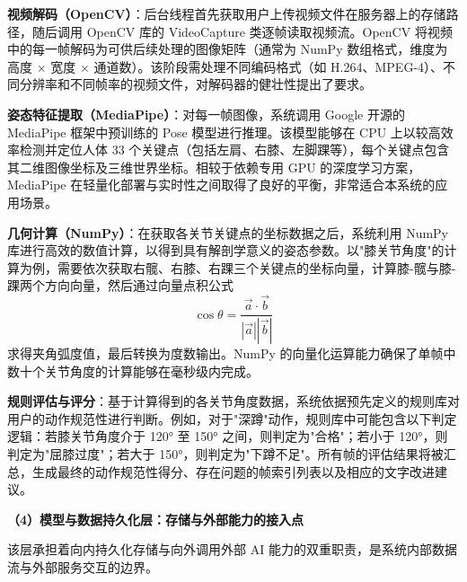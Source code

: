 \begin{chineseenum}
  \item \textbf{视频解码（OpenCV）}：后台线程首先获取用户上传视频文件在服务器上的存储路径，随后调用 OpenCV 库的 VideoCapture 类逐帧读取视频流。OpenCV 将视频中的每一帧解码为可供后续处理的图像矩阵（通常为 NumPy 数组格式，维度为高度 × 宽度 × 通道数）。该阶段需处理不同编码格式（如 H.264、MPEG-4）、不同分辨率和不同帧率的视频文件，对解码器的健壮性提出了要求。

  \item \textbf{姿态特征提取（MediaPipe）}：对每一帧图像，系统调用 Google 开源的 MediaPipe 框架中预训练的 Pose 模型进行推理。该模型能够在 CPU 上以较高效率检测并定位人体 33 个关键点（包括左肩、右膝、左脚踝等），每个关键点包含其二维图像坐标及三维世界坐标。相较于依赖专用 GPU 的深度学习方案，MediaPipe 在轻量化部署与实时性之间取得了良好的平衡，非常适合本系统的应用场景。

  \item \textbf{几何计算（NumPy）}：在获取各关节关键点的坐标数据之后，系统利用 NumPy 库进行高效的数值计算，以得到具有解剖学意义的姿态参数。以"膝关节角度"的计算为例，需要依次获取右髋、右膝、右踝三个关键点的坐标向量，计算膝-髋与膝-踝两个方向向量，然后通过向量点积公式
  \begin{equation}
    \cos\theta = \frac{\vec{a} \cdot \vec{b}}{|\vec{a}| |\vec{b}|}
  \end{equation}
  求得夹角弧度值，最后转换为度数输出。NumPy 的向量化运算能力确保了单帧中数十个关节角度的计算能够在毫秒级内完成。

  \item \textbf{规则评估与评分}：基于计算得到的各关节角度数据，系统依据预先定义的规则库对用户的动作规范性进行判断。例如，对于"深蹲"动作，规则库中可能包含以下判定逻辑：若膝关节角度介于 120° 至 150° 之间，则判定为"合格"；若小于 120°，则判定为"屈膝过度"；若大于 150°，则判定为"下蹲不足"。所有帧的评估结果将被汇总，生成最终的动作规范性得分、存在问题的帧索引列表以及相应的文字改进建议。
\end{chineseenum}

\textbf{（4）模型与数据持久化层：存储与外部能力的接入点}

该层承担着向内持久化存储与向外调用外部 AI 能力的双重职责，是系统内部数据流与外部服务交互的边界。


